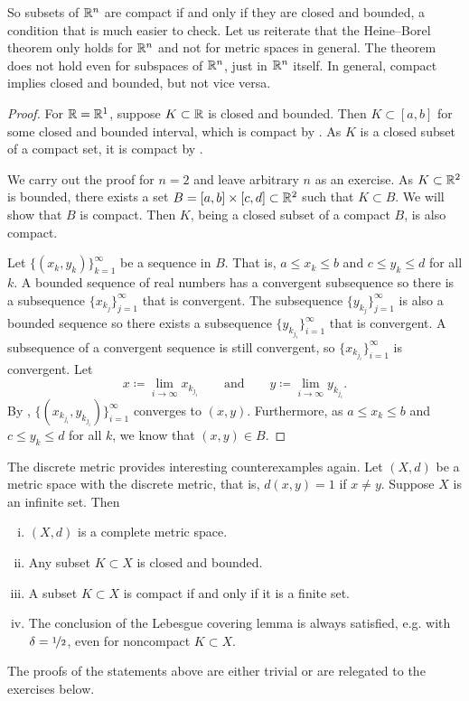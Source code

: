 So subsets of ${\mathbb{R}}^n$ are compact if and only if they are closed and bounded,
a condition that is much easier to check.
Let us reiterate that the Heine--Borel theorem only holds for ${\mathbb{R}}^n$ and not
for metric spaces in general.
The theorem does not hold even for subspaces of ${\mathbb{R}}^n$, just in ${\mathbb{R}}^n$
itself.
In general, compact implies closed and
bounded, but not vice versa.

\begin{proof}
For ${\mathbb{R}} = {\mathbb{R}}^1$, suppose $K \subset {\mathbb{R}}$ is closed and bounded.
Then $K \subset [a,b]$ for some closed and bounded interval,
which is compact by .
As $K$ is a closed subset of a compact set,
it is compact by .

We carry out the proof for $n=2$ and leave arbitrary $n$ as an exercise.
As $K \subset {\mathbb{R}}^2$ is bounded, there exists a set
$B=[a,b]\times[c,d] \subset {\mathbb{R}}^2$ such that $K \subset B$.  We will show
that $B$ is compact.  Then $K$, being a closed subset of a compact $B$, is
also compact.  

Let $\bigl\{ (x_k,y_k) \bigr\}_{k=1}^\infty$ be a sequence in $B$.  That is,
$a \leq x_k \leq b$ and
$c \leq y_k \leq d$ for all $k$.  A bounded sequence of real numbers
has a convergent
subsequence so there is a subsequence $\{ x_{k_j} \}_{j=1}^\infty$
that is convergent.  The subsequence 
$\{ y_{k_j} \}_{j=1}^\infty$ is also a bounded sequence so there exists
a subsequence
$\{ y_{k_{j_i}} \}_{i=1}^\infty$ that is convergent.  A subsequence of a
convergent sequence is still convergent, so 
$\{ x_{k_{j_i}} \}_{i=1}^\infty$ is convergent.
Let
\begin{equation*}
x \coloneqq \lim_{i\to\infty} x_{k_{j_i}}
\qquad \text{and} \qquad
y \coloneqq \lim_{i\to\infty} y_{k_{j_i}} .
\end{equation*}
By ,
$\bigl\{ (x_{k_{j_i}},y_{k_{j_i}}) \bigr\}_{i=1}^\infty$ converges to $(x,y)$.
Furthermore, as $a \leq x_k \leq b$ and
$c \leq y_k \leq d$ for all $k$, we know that $(x,y) \in B$.
\end{proof}

\begin{example}
The discrete metric provides interesting counterexamples again.
Let $(X,d)$ be a metric space with the discrete metric, that is, $d(x,y) = 1$
if $x \not= y$.  Suppose
$X$ is an infinite set.  Then
\begin{enumerate}[(i)]
\item $(X,d)$ is a complete metric space.
\item Any subset $K \subset X$ is closed and bounded.
\item A subset $K \subset X$ is compact if and only if it is a finite set.
\item The conclusion of the Lebesgue covering lemma is always satisfied,
e.g. with $\delta = \nicefrac{1}{2}$,
even for noncompact $K \subset X$.
\end{enumerate}
The proofs
of the statements above are either trivial or are relegated to the exercises
below.
\end{example}

